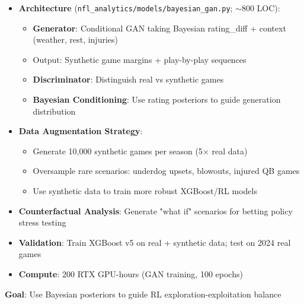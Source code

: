 \begin{itemize}
  \item {} \textbf{Architecture} (\texttt{nfl\_analytics/models/bayesian\_gan.py}; $\sim$800 LOC):
  \begin{itemize}
    \item \textbf{Generator}: Conditional GAN taking Bayesian rating\_diff + context (weather, rest, injuries)
    \item Output: Synthetic game margins + play-by-play sequences
    \item \textbf{Discriminator}: Distinguish real vs synthetic games
    \item \textbf{Bayesian Conditioning}: Use rating posteriors to guide generation distribution
  \end{itemize}
  \item {} \textbf{Data Augmentation Strategy}:
  \begin{itemize}
    \item Generate 10,000 synthetic games per season (5$\times$ real data)
    \item Oversample rare scenarios: underdog upsets, blowouts, injured QB games
    \item Use synthetic data to train more robust XGBoost/RL models
  \end{itemize}
  \item {} \textbf{Counterfactual Analysis}: Generate "what if" scenarios for betting policy stress testing
  \item {} \textbf{Validation}: Train XGBoost v5 on real + synthetic data; test on 2024 real games
  \item \textbf{Compute}: 200 RTX GPU-hours (GAN training, 100 epochs)
\end{itemize}

\textbf{Goal}: Use Bayesian posteriors to guide RL exploration-exploitation balance

